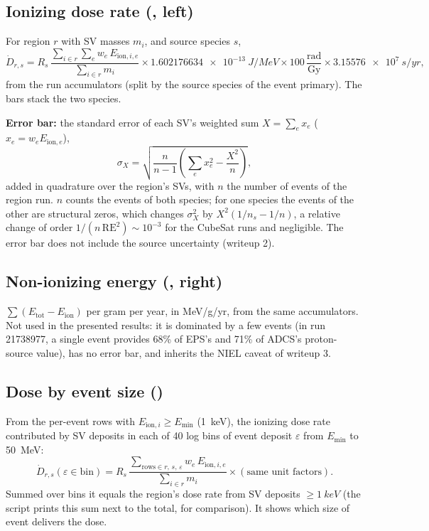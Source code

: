 \subsection{Ionizing dose rate (, left)}
For region $r$ with SV masses $m_i$, and source species $s$,
\begin{equation}
  \dot D_{r,s} = R_s\,\frac{\sum_{i\in r}\sum_e w_e\,E_{\text{ion},i,e}}{\sum_{i\in r} m_i}
  \times \SI{1.602176634e-13}{J/MeV}\times100\,\frac{\text{rad}}{\text{Gy}}\times\SI{3.15576e7}{s/yr},
\end{equation}
from the run accumulators  (split by the source species of the event primary). The bars stack the two species.

\textbf{Error bar:} the \gfour{} standard error of each SV's weighted sum $X=\sum_e x_e$ ($x_e = w_eE_{\text{ion},e}$),
\begin{equation}
  \sigma_X = \sqrt{\frac{n}{n-1}\left(\sum_e x_e^2 - \frac{X^2}{n}\right)},
\end{equation}
added in quadrature over the region's SVs, with $n$ the number of events of the region run. $n$ counts the events of both species; for one species the events of the other are structural zeros, which changes $\sigma_X^2$ by $X^2(1/n_s - 1/n)$, a relative change of order $1/(n\,\text{RE}^2)\sim10^{-3}$ for the CubeSat runs and negligible. The error bar does not include the \mcdc{} source uncertainty (writeup 2).

\subsection{Non-ionizing energy (, right)}
$\sum (E_\text{tot}-E_\text{ion})$ per gram per year, in \si{MeV/g/yr}, from the same accumulators. Not used in the presented results: it is dominated by a few events (in run 21738977, a single event provides 68\% of EPS's and 71\% of ADCS's proton-source value), has no error bar, and inherits the NIEL caveat of writeup 3.

\subsection{Dose by event size ()}
From the per-event rows with $E_{\text{ion},i}\ge E_\text{min}$ (\SI{1}{keV}), the ionizing dose rate contributed by SV deposits in each of 40 log bins of event deposit $\varepsilon$ from $E_\text{min}$ to \SI{50}{MeV}:
\begin{equation}
  \dot D_{r,s}(\varepsilon\in\text{bin}) = R_s\,\frac{\sum_{\text{rows}\in r,\,s,\,\varepsilon} w_e\,E_{\text{ion},i,e}}{\sum_{i\in r}m_i}\times(\text{same unit factors}).
\end{equation}
Summed over bins it equals the region's dose rate from SV deposits $\ge\SI{1}{keV}$ (the script prints this sum next to the total, for comparison). It shows which size of event delivers the dose.

